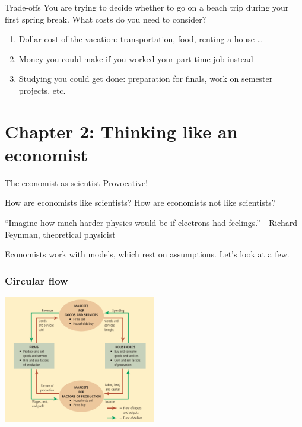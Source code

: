 \documentclass[aspectratio=169]{beamer}
\begin{document}
\begin{frame}{Trade-offs}
    You are trying to decide whether to go on a beach trip during your first spring break. What costs do you need to consider? 

    \medskip

    \begin{enumerate}
        \item Dollar cost of the vacation: transportation, food, renting a house \dots
        \item Money you could make if you worked your part-time job instead
        \item Studying you could get done: preparation for finals, work on semester projects, etc.
    \end{enumerate}
\end{frame}

\section{Chapter 2: Thinking like an economist}

\begin{frame}{The economist as scientist}
    Provocative! 

    \medskip

    How are economists like scientists? 
    How are economists not like scientists?

    \medskip

    \begin{block}{“Imagine how much harder physics would be if electrons had feelings.”}
        - Richard Feynman, theoretical physicist
    \end{block}

    \medskip

    Economists work with models, which rest on assumptions. Let's look at a few.
\end{frame}

\begin{frame}
    \frametitle{Circular flow}
    \centering
    \includegraphics[width = 0.5\textwidth,keepaspectratio]{model1.png}
\end{frame}
\end{document}
